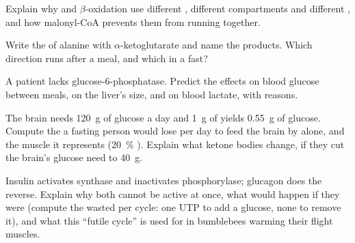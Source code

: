 \begin{exercise}[$\star\star$]\label{exo:b1:biosyntheses-integration:7}
Explain why  and $\beta$-oxidation use different
, different compartments and different , and how
malonyl-CoA prevents them from running together.
\end{exercise}

\begin{exercise}[$\star\star$]\label{exo:b1:biosyntheses-integration:8}
Write the  of alanine with $\alpha$-ketoglutarate and
name the products. Which direction runs after a  meal, and
which in a fast?
\end{exercise}

\begin{exercise}[$\star\star$]\label{exo:b1:biosyntheses-integration:9}
A patient lacks glucose-6-phosphatase. Predict the effects on blood
glucose between meals, on the liver's size, and on blood lactate, with
reasons.
\end{exercise}

\begin{exercise}[$\star\star\star$]\label{exo:b1:biosyntheses-integration:10}
The brain needs \qty{120}{g} of glucose a day and \qty{1}{g} of 
yields \qty{0.55}{g} of glucose. Compute the  a fasting person
would lose per day to feed the brain by  alone, and the
muscle it represents (\qty{20}{\%} ). Explain what ketone bodies
change, if they cut the brain's glucose need to \qty{40}{g}.
\end{exercise}

\begin{exercise}[$\star\star\star$]\label{exo:b1:biosyntheses-integration:11}
Insulin activates  synthase and inactivates 
phosphorylase; glucagon does the reverse. Explain why both cannot be
active at once, what would happen if they were (compute the  wasted
per cycle: one UTP to add a glucose, none to remove it), and what
this ``futile cycle'' is used for in bumblebees warming their flight
muscles.
\end{exercise}

